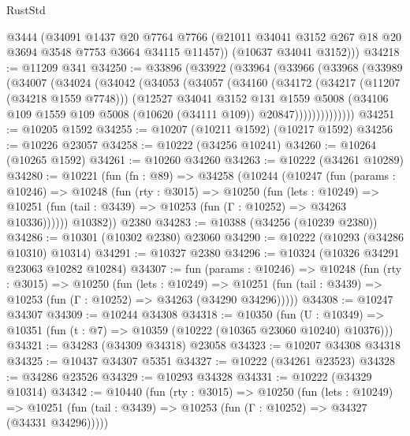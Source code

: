 \begin{lexlean}{RustStd}
\begin{coremodule}
        @3444
        (@34091
          @1437
          @20
          @7764
          @7766
          (@21011 @34041 @3152 @267 @18 @20 @3694 @3548 @7753 @3664 @34115 @11457))
        (@10637 @34041 @3152)))
@34218 := @11209 @341
@34250 := @33896
    (@33922
      (@33964
        (@33966
          (@33968
            (@33989
              (@34007
                (@34024
                  (@34042
                    (@34053
                      (@34057
                        (@34160
                          (@34172
                            (@34217 (@11207 (@34218 @1559 @7748)))
                            (@12527
                              @34041
                              @3152
                              @131
                              @1559
                              @5008
                              (@34106
                                @109
                                @1559
                                @109
                                @5008
                                (@10620 (@34111 @109))
                                @20847))))))))))))))
@34251 := @10205 @1592
@34255 := @10207 (@10211 @1592) (@10217 @1592)
@34256 := @10226 @23057
@34258 := @10222 (@34256 @10241)
@34260 := @10264 (@10265 @1592)
@34261 := @10260 @34260
@34263 := @10222 (@34261 @10289)
@34280 := @10221
    (fun (fn : @89) =>
    @34258
      (@10244
        (@10247
          (fun (params : @10246) =>
          @10248
            (fun (rty : @3015) =>
            @10250
              (fun (lets : @10249) =>
              @10251 (fun (tail : @3439) => @10253 (fun (Γ : @10252) => @34263 @10336))))))
        @10382))
    @2380
@34283 := @10388 (@34256 (@10239 @2380))
@34286 := @10301 (@10302 @2380) @23060
@34290 := @10222 (@10293 (@34286 @10310) @10314)
@34291 := @10327 @2380
@34296 := @10324 (@10326 @34291 @23063 @10282 @10284)
@34307 := fun (params : @10246) =>
  @10248
    (fun (rty : @3015) =>
    @10250
      (fun (lets : @10249) =>
      @10251 (fun (tail : @3439) => @10253 (fun (Γ : @10252) => @34263 (@34290 @34296)))))
@34308 := @10247 @34307
@34309 := @10244 @34308
@34318 := @10350
    (fun (U : @10349) => @10351 (fun (t : @7) => @10359 (@10222 (@10365 @23060 @10240) @10376)))
@34321 := @34283 (@34309 @34318) @23058
@34323 := @10207 @34308 @34318
@34325 := @10437 @34307 @5351
@34327 := @10222 (@34261 @23523)
@34328 := @34286 @23526
@34329 := @10293 @34328
@34331 := @10222 (@34329 @10314)
@34342 := @10440
    (fun (rty : @3015) =>
    @10250
      (fun (lets : @10249) =>
      @10251 (fun (tail : @3439) => @10253 (fun (Γ : @10252) => @34327 (@34331 @34296)))))

\end{coremodule}
\end{lexlean}
